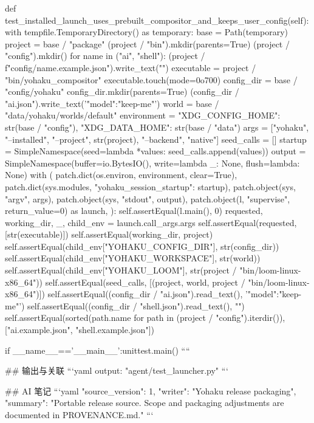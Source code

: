     def test_installed_launch_uses_prebuilt_compositor_and_keeps_user_config(self):
        with tempfile.TemporaryDirectory() as temporary:
            base = Path(temporary)
            project = base / "package"
            (project / "bin").mkdir(parents=True)
            (project / "config").mkdir()
            for name in ("ai", "shell"):
                (project / f"config/{name}.example.json").write_text("{}")
            executable = project / "bin/yohaku_compositor"
            executable.touch(mode=0o700)
            config_dir = base / "config/yohaku"
            config_dir.mkdir(parents=True)
            (config_dir / "ai.json").write_text('{"model":"keep-me"}')
            world = base / "data/yohaku/worlds/default"
            environment = {"XDG_CONFIG_HOME": str(base / "config"), "XDG_DATA_HOME": str(base / "data")}
            args = ["yohaku", "--installed", "--project", str(project), "--backend", "native"]
            seed_calls = []
            startup = SimpleNamespace(seed=lambda *values: seed_calls.append(values))
            output = SimpleNamespace(buffer=io.BytesIO(), write=lambda _: None, flush=lambda: None)
            with (
                patch.dict(os.environ, environment, clear=True),
                patch.dict(sys.modules, {"yohaku_session_startup": startup}),
                patch.object(sys, "argv", args),
                patch.object(sys, "stdout", output),
                patch.object(l, "supervise", return_value=0) as launch,
            ):
                self.assertEqual(l.main(), 0)
            requested, working_dir, _, child_env = launch.call_args.args
            self.assertEqual(requested, [str(executable)])
            self.assertEqual(working_dir, project)
            self.assertEqual(child_env["YOHAKU_CONFIG_DIR"], str(config_dir))
            self.assertEqual(child_env["YOHAKU_WORKSPACE"], str(world))
            self.assertEqual(child_env["YOHAKU_LOOM"], str(project / "bin/loom-linux-x86_64"))
            self.assertEqual(seed_calls, [(project, world, project / "bin/loom-linux-x86_64")])
            self.assertEqual((config_dir / "ai.json").read_text(), '{"model":"keep-me"}')
            self.assertEqual((config_dir / "shell.json").read_text(), "{}")
            self.assertEqual(sorted(path.name for path in (project / "config").iterdir()),
                             ["ai.example.json", "shell.example.json"])


if __name__=='__main__':unittest.main()
````

## 输出与关联
```yaml
output: "agent/test_launcher.py"
```

## AI 笔记
```yaml
{"source_version": 1, "writer": "Yohaku release packaging", "summary": "Portable release source. Scope and packaging adjustments are documented in PROVENANCE.md."}
```
